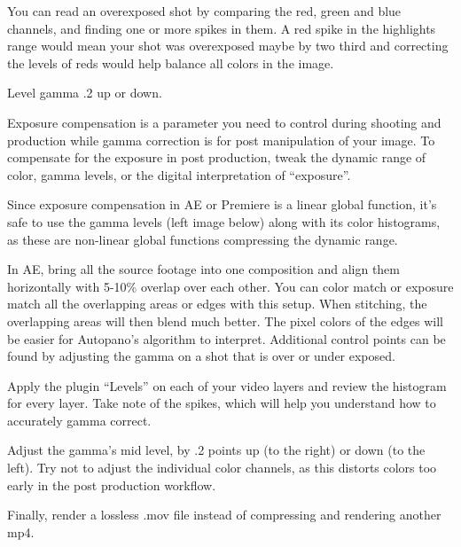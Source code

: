 \begin{fullwidth}
You can read an overexposed shot by comparing the red, green and blue channels, and finding one or more spikes in them. A red spike in the highlights range would mean your shot was overexposed maybe by two third and correcting the levels of reds would help balance all colors in the image.

{\large Level gamma .2 up or down. \par}

Exposure compensation is a parameter you need to control during shooting and production while gamma correction is for post manipulation of your image. To compensate for the exposure in post production, tweak the dynamic range of color, gamma levels, or the digital interpretation of “exposure”. 

Since exposure compensation in AE or Premiere is a linear global function, it’s safe to use the gamma levels (left image below) along with its color histograms, as these are non-linear global functions compressing the dynamic range. 


In AE, bring all the source footage into one composition and align them horizontally with 5-10\% overlap over each other. You can color match or exposure match all the overlapping areas or edges with this setup. When stitching, the overlapping areas will then blend much better. The pixel colors of the edges will be easier for Autopano’s algorithm to interpret. Additional control points can be found by adjusting the gamma on a shot that is over or under exposed.


Apply the plugin “Levels” on each of your video layers and review the histogram for every layer. Take note of the spikes, which will help you understand how to accurately gamma correct.


Adjust the gamma’s mid level, by .2 points up (to the right) or down (to the left). Try not to adjust the individual color channels, as this distorts colors too early in the post production workflow.


Finally, render a lossless .mov file instead of compressing and rendering another mp4.


\clearpage
\end{fullwidth}